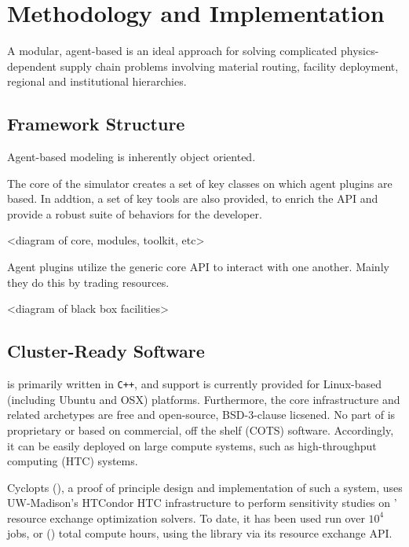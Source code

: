 \section{Methodology and Implementation}

A modular, agent-based is an ideal approach for solving complicated
physics-dependent supply chain problems involving material routing, facility
deployment, regional and institutional hierarchies.

\subsection{Framework Structure}

Agent-based modeling is inherently object oriented. 

The core of the simulator creates a set of key classes on which agent plugins 
are based. In addtion, a set of key tools are also provided, to enrich the API 
and provide a robust suite of behaviors for the developer.

<diagram of core, modules, toolkit, etc>

Agent plugins utilize the generic core API to interact with one another. 
Mainly they do this by trading resources. 

<diagram of black box facilities>

\subsection{Cluster-Ready Software}

\Cyclus is primarily written in \texttt{C++}, and support is currently provided
for Linux-based (including Ubuntu and OSX) platforms. Furthermore, the core
infrastructure and related archetypes are free and open-source, BSD-3-clause
licsened. No part of \Cyclus is proprietary or based on commercial, off the
shelf (COTS) software. Accordingly, it can be easily deployed on large compute
systems, such as high-throughput computing (HTC) systems.

Cyclopts (), a proof of principle design and implementation of such a
system, uses UW-Madison's HTCondor HTC infrastructure to perform sensitivity
studies on \Cyclus' resource exchange optimization solvers. To date, it has been
used run over $10^4$ jobs, or () total compute hours, using
the \Cyclus library via its resource exchange API.


